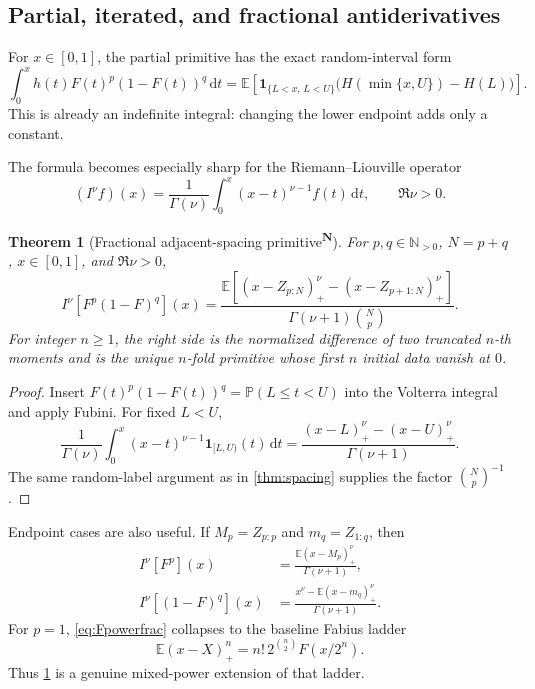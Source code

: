 \documentclass[11pt,oneside]{article}
\newtheorem{theorem}{Theorem}[section]
\theoremstyle{definition}
\theoremstyle{remark}
\newcommand{\F}{F}
\newcommand{\E}{\mathbb E}
\newcommand{\Pp}{\mathbb P}
\newcommand{\N}{\mathbb N}
\newcommand{\dd}{\,\mathrm d}
\newcommand{\tagnew}{\textsuperscript{\textcolor{oliveink}{\bfseries N}}}
\begin{document}
\subsection{Partial, iterated, and fractional antiderivatives}

For \(x\in[0,1]\), the partial primitive has the exact random-interval form
\begin{equation}\label{eq:partialspacing}
 \int_0^x h(t)\F(t)^p(1-\F(t))^q\dd t
 =\E\!\left[
 \mathbf1_{\{L<x,\,L<U\}}
 \bigl(H(\min\{x,U\})-H(L)\bigr)
 \right].
\end{equation}
This is already an indefinite integral: changing the lower endpoint adds only a
constant.

The formula becomes especially sharp for the Riemann--Liouville operator
\begin{equation}
 (I^\nu f)(x)=\frac1{\Gamma(\nu)}\int_0^x(x-t)^{\nu-1}f(t)\dd t,
 \qquad \Re\nu>0.
\end{equation}

\begin{theorem}[Fractional adjacent-spacing primitive\tagnew]\label{thm:fracspacing}
For \(p,q\in\N_{>0}\), \(N=p+q\), \(x\in[0,1]\), and \(\Re\nu>0\),
\begin{equation}\label{eq:fracspacing}
 \boxed{
 I^\nu\!\left[\F^p(1-\F)^q\right](x)
 =\frac{\E\left[(x-Z_{p:N})_+^\nu-(x-Z_{p+1:N})_+^\nu\right]}
 {\Gamma(\nu+1)\binom Np}.}
\end{equation}
For integer \(n\ge1\), the right side is the normalized difference of two
truncated \(n\)-th moments and is the unique \(n\)-fold primitive whose first
\(n\) initial data vanish at \(0\).
\end{theorem}

\begin{proof}
Insert
\(\F(t)^p(1-\F(t))^q=\Pp(L\le t<U)\) into the Volterra integral and apply
Fubini.  For fixed \(L<U\),
\[
 \frac1{\Gamma(\nu)}\int_0^x(x-t)^{\nu-1}\mathbf1_{[L,U)}(t)\dd t
 =\frac{(x-L)_+^\nu-(x-U)_+^\nu}{\Gamma(\nu+1)}.
\]
The same random-label argument as in \cref{thm:spacing} supplies the factor
\(\binom Np^{-1}\).
\end{proof}

Endpoint cases are also useful.  If \(M_p=Z_{p:p}\) and \(m_q=Z_{1:q}\), then
\begin{align}
 I^\nu[\F^p](x)
 &=\frac{\E(x-M_p)_+^\nu}{\Gamma(\nu+1)},\label{eq:Fpowerfrac}\\
 I^\nu[(1-\F)^q](x)
 &=\frac{x^\nu-\E(x-m_q)_+^\nu}{\Gamma(\nu+1)}.\label{eq:survfrac}
\end{align}
For \(p=1\), \eqref{eq:Fpowerfrac} collapses to the baseline Fabius ladder
\begin{equation}\label{eq:Fvolterraladder}
 \E(x-X)_+^n=n!\,2^{\binom n2}\F(x/2^n).
\end{equation}
Thus \cref{thm:fracspacing} is a genuine mixed-power extension of that ladder.
\end{document}
